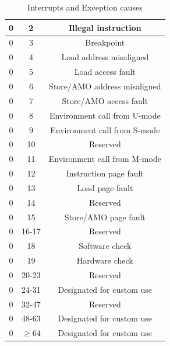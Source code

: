 \begin{table}
\begin{tabular}{|c|c|c|}
    \hline
    0                  & 2             & Illegal instruction            \\
    \hline
    0                  & 3             & Breakpoint                     \\
    \hline
    0                  & 4             & Load address misaligned        \\
    \hline
    0                  & 5             & Load access fault              \\
    \hline
    0                  & 6             & Store/AMO address misaligned   \\
    \hline
    0                  & 7             & Store/AMO access fault         \\
    \hline
    0                  & 8             & Environment call from U-mode   \\
    \hline
    0                  & 9             & Environment call from S-mode   \\
    \hline
    0                  & 10            & Reserved                       \\
    \hline
    0                  & 11            & Environment call from M-mode   \\
    \hline
    0                  & 12            & Instruction page fault         \\
    \hline
    0                  & 13            & Load page fault                \\
    \hline
    0                  & 14            & Reserved                       \\
    \hline
    0                  & 15            & Store/AMO page fault           \\
    \hline
    0                  & 16-17         & Reserved                       \\
    \hline
    0                  & 18            & Software check                 \\
    \hline
    0                  & 19            & Hardware check                 \\
    \hline
    0                  & 20-23         & Reserved                       \\
    \hline
    0                  & 24-31         & Designated for custom use      \\
    \hline
    0                  & 32-47         & Reserved                       \\
    \hline
    0                  & 48-63         & Designated for custom use      \\
    \hline
    0                  & $\geq 64$     & Designated for custom use      \\
    \hline
  \end{tabular}
  \caption{Interrupts and Exception causes}
  \label{tab:causes}
\end{table}

